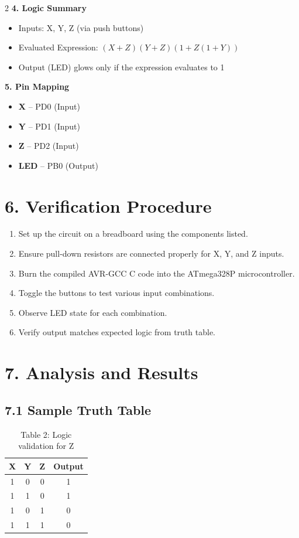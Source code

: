 \documentclass[12pt]{article}
\begin{document}
\begin{multicols}{2}
\vspace{1em}
\noindent\textbf{4. Logic Summary}
\begin{itemize}
    \item Inputs: X, Y, Z (via push buttons)
    \item Evaluated Expression: \( (X + Z)(Y + Z)(1 + Z(1 + Y)) \)
    \item Output (LED) glows only if the expression evaluates to 1
\end{itemize}

\vspace{1em}
\noindent\textbf{5. Pin Mapping}
\begin{itemize}
    \item \textbf{X} – PD0 (Input)
    \item \textbf{Y} – PD1 (Input)
    \item \textbf{Z} – PD2 (Input)
    \item \textbf{LED} – PB0 (Output)
\end{itemize}

\end{multicols}

\section*{6. Verification Procedure}
\begin{enumerate}
    \item Set up the circuit on a breadboard using the components listed.
    \item Ensure pull-down resistors are connected properly for X, Y, and Z inputs.
    \item Burn the compiled AVR-GCC C code into the ATmega328P microcontroller.
    \item Toggle the buttons to test various input combinations.
    \item Observe LED state for each combination.
    \item Verify output matches expected logic from truth table.
\end{enumerate}

\section*{7. Analysis and Results}

\subsection*{7.1 Sample Truth Table}
\begin{table}[H]
\centering
\begin{tabular}{|c|c|c|c|}
\hline
X & Y & Z & Output \\
\hline
1 & 0 & 0 & 1 \\
1 & 1 & 0 & 1 \\
1 & 0 & 1 & 0 \\
1 & 1 & 1 & 0 \\
\hline
\end{tabular}
\caption*{Table 2: Logic validation for Z}
\end{table}
\end{document}
